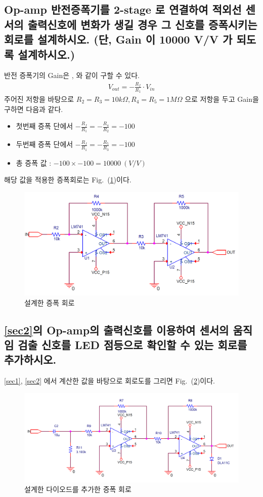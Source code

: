 \documentclass{article}
\begin{document}
\subsection{Op-amp 반전증폭기를 2-stage 로 연결하여 적외선 센서의 출력신호에 변화가 생길 경우 그 신호를 증폭시키는 회로를 설계하시오. (단, Gain 이 10000 V/V 가 되도록 설계하시오.)\label{sec2}}
반전 증폭기의 Gain은 \cite{alexander2023fundamentals}, \cite{ele}와 같이 구할 수 있다.
\begin{align}
    V_{out} = -\frac{R_f}{R_1}\cdot V_{in}
\end{align}
주어진 저항을 바탕으로 $R_2 = R_3 = 10k\Omega, R_4 = R_5 = 1M\Omega$ 으로 저항을 두고 Gain을 구하면 다음과 같다.
\begin{itemize}
    \item 첫번째 증폭 단에서 $-\frac{R_f}{R_1} = -\frac{R_4}{R_2} = -100$
    \item 두번째 증폭 단에서 $-\frac{R_f}{R_1} = -\frac{R_5}{R_3} = -100$
    \item 총 증폭 값 : $-100\times-100 = 10000~(V/V)$
\end{itemize}
해당 값을 적용한 증폭회로는 Fig.~(\ref{fig2})이다.

\begin{figure}[H]
    \centering
    \includegraphics[width=0.7\linewidth]{figures/fig2.png}
    \caption{설계한 증폭 회로}
    \label{fig2}
\end{figure}

\subsection{\ref{sec2}의 Op-amp의 출력신호를 이용하여 센서의 움직임 검출 신호를 LED 점등으로 확인할 수 있는 회로를 추가하시오.}
\ref{sec1}, \ref{sec2} 에서 계산한 값을 바탕으로 회로도를 그리면 Fig.~(\ref{fig3})이다.

\begin{figure}[H]
    \centering
    \includegraphics[width=0.7\linewidth]{figures/fig3.png}
    \caption{설계한 다이오드를 추가한 증폭 회로}
    \label{fig3}
\end{figure}




\end{document}
